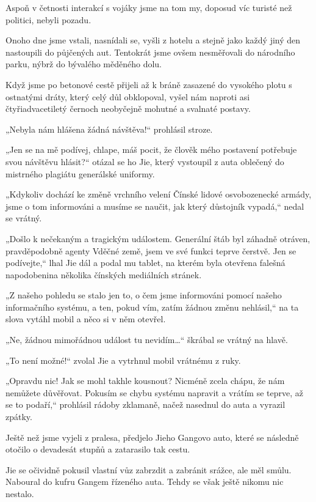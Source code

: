 Aspoň v četnosti interakcí s vojáky jsme na tom my, doposud víc turisté než politici, nebyli pozadu.   
\vspace{0.75cm}

Onoho dne jsme vstali, nasnídali se, vyšli z hotelu a stejně jako každý jiný den nastoupili do půjčených aut. Tentokrát jsme ovšem nesměřovali do národního parku, nýbrž do bývalého měděného dolu.

Když jsme po betonové cestě přijeli až k bráně zasazené do vysokého plotu s ostnatými dráty, který celý důl obklopoval, vyšel nám naproti asi čtyřiadvacetiletý černoch neobyčejně mohutné a svalnaté postavy. 

„Nebyla nám hlášena žádná návštěva!“ prohlásil stroze.

„Jen se na mě podívej, chlape, máš pocit, že člověk mého postavení potřebuje svou návštěvu hlásit?“ otázal se ho Jie, který vystoupil z auta oblečený do mistrného plagiátu generálské uniformy.

„Kdykoliv dochází ke změně vrchního velení Čínské lidové osvobozenecké armády, jsme o tom informováni a musíme se naučit, jak který důstojník vypadá,“ nedal se vrátný.

„Došlo k nečekaným a tragickým událostem. Generální štáb byl záhadně otráven, pravděpodobně agenty Vděčné země, jsem ve své funkci teprve čerstvě. Jen se podívejte,“ lhal Jie dál a podal mu tablet, na kterém byla otevřena falešná napodobenina několika čínských mediálních stránek.

„Z našeho pohledu se stalo jen to, o čem jsme informováni pomocí našeho informačního systému, a ten, pokud vím, zatím žádnou změnu nehlásil,“ na ta slova vytáhl mobil a něco si v něm otevřel.

„Ne, žádnou mimořádnou událost tu nevidím…“ škrábal se vrátný na hlavě.

„To není možné!“ zvolal Jie a vytrhnul mobil vrátnému z ruky.

„Opravdu nic! Jak se mohl takhle kousnout? Nicméně zcela chápu, že nám nemůžete důvěřovat. Pokusím se chybu systému napravit a vrátím se teprve, až se to podaří,“ prohlásil rádoby zklamaně, načež nasednul do auta a vyrazil zpátky.

Ještě než jsme vyjeli z pralesa, předjelo Jieho  Gangovo auto, které se následně otočilo o devadesát stupňů a zatarasilo tak cestu. 

Jie se očividně pokusil vlastní vůz zabrzdit a zabránit srážce, ale měl smůlu. Naboural do kufru Gangem řízeného auta. Tehdy se však ještě nikomu nic nestalo.

